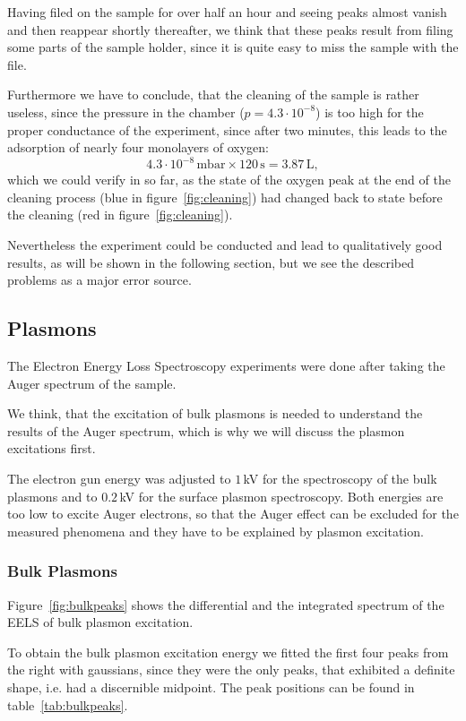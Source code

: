 \documentclass[a4paper,10pt]{scrartcl}
\begin{document}
Having filed on the sample for over half an hour and seeing  peaks almost vanish and then reappear shortly thereafter, we think that these peaks result from filing some parts of the sample holder, since it is quite easy to miss the sample with the file.

Furthermore we have to conclude, that the cleaning of the sample is rather useless, since the pressure in the chamber ($p = 4.3 \cdot 10^{-8}$) is too high for the proper conductance of the experiment, since after two minutes, this leads to the adsorption of nearly four monolayers of oxygen:
\begin{equation}
4.3 \cdot 10^{-8}\,\mbox{mbar} \times 120\,\mbox{s} = 3.87\,\mbox{L},
\end{equation} 
which we could verify in so far, as the state of the oxygen peak at the end of the cleaning process (blue in figure~\ref{fig:cleaning}) had changed back to state before the cleaning (red in figure~\ref{fig:cleaning}).

Nevertheless the experiment could be conducted and lead to qualitatively good results, as will be shown in the following section, but we see the described problems as a major error source.

\subsection{Plasmons}

The Electron Energy Loss Spectroscopy experiments were done after taking the Auger spectrum of the sample. 

We think, that the excitation of bulk plasmons is needed to understand the results of the Auger spectrum, which is why we will discuss the plasmon excitations first.

The electron gun energy was adjusted to $1\,$kV for the spectroscopy of the bulk plasmons and to $0.2\,$kV for the surface plasmon spectroscopy. Both energies are too low to excite Auger electrons, so that the Auger effect can be excluded for the measured phenomena and they have to be explained by plasmon excitation.

\subsubsection{Bulk Plasmons}

Figure~\ref{fig:bulkpeaks} shows the differential and the integrated spectrum of the EELS of bulk plasmon excitation. 

To obtain the bulk plasmon excitation energy we fitted the first four peaks from the right with gaussians, since they were the only peaks, that exhibited a definite shape, i.e. had a discernible midpoint. The peak positions can be found in table~\ref{tab:bulkpeaks}.
\end{document}
